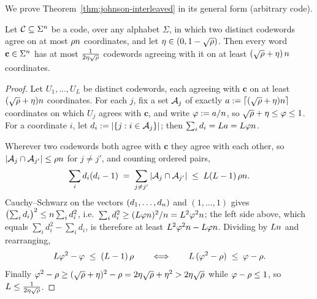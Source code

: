 We prove Theorem~\ref{thm:johnson-interleaved} in its general form (arbitrary code).

\begin{theorem}\label{thm:johnson-general}
Let $\mathcal{C} \subseteq \Sigma^n$ be a code, over any alphabet $\Sigma$, in which two distinct codewords agree on at most $\rho n$ coordinates, and let $\eta \in (0, 1 - \sqrt{\rho})$. Then every word $\mathbf{c} \in \Sigma^n$ has at most $\tfrac{1}{2\eta\sqrt{\rho}}$ codewords agreeing with it on at least $(\sqrt{\rho} + \eta)\, n$ coordinates.
\end{theorem}

\begin{proof}
Let $U_1, \dots, U_L$ be distinct codewords, each agreeing with $\mathbf{c}$ on at least $(\sqrt{\rho}+\eta) n$ coordinates. For each $j$, fix a set $\mathcal{A}_j$ of exactly $a := \lceil (\sqrt{\rho}+\eta) n \rceil$ coordinates on which $U_j$ agrees with $\mathbf{c}$, and write $\varphi := a/n$, so $\sqrt{\rho} + \eta \le \varphi \le 1$. For a coordinate $i$, let $d_i := |\{ j : i \in \mathcal{A}_j \}|$; then $\sum_i d_i = L a = L \varphi n$.

Wherever two codewords both agree with $\mathbf{c}$ they agree with each other, so $|\mathcal{A}_j \cap \mathcal{A}_{j'}| \le \rho n$ for $j \neq j'$, and counting ordered pairs,
\[
\sum_i d_i (d_i - 1) \;=\; \sum_{j \neq j'} |\mathcal{A}_j \cap \mathcal{A}_{j'}| \;\le\; L(L-1)\, \rho n .
\]
Cauchy--Schwarz on the vectors $(d_1, \dots, d_n)$ and $(1, \dots, 1)$ gives $\bigl(\sum_i d_i\bigr)^2 \le n \sum_i d_i^2$, i.e.\ $\sum_i d_i^2 \ge (L \varphi n)^2 / n = L^2 \varphi^2 n$; the left side above, which equals $\sum_i d_i^2 - \sum_i d_i$, is therefore at least $L^2 \varphi^2 n - L \varphi n$. Dividing by $Ln$ and rearranging,
\[
L \varphi^2 - \varphi \;\le\; (L-1)\, \rho
\qquad\Longleftrightarrow\qquad
L\, (\varphi^2 - \rho) \;\le\; \varphi - \rho .
\]
Finally $\varphi^2 - \rho \ge (\sqrt{\rho}+\eta)^2 - \rho = 2\eta\sqrt{\rho} + \eta^2 > 2\eta\sqrt{\rho}$ while $\varphi - \rho \le 1$, so $L \le \tfrac{1}{2\eta\sqrt{\rho}}$.
\end{proof}
